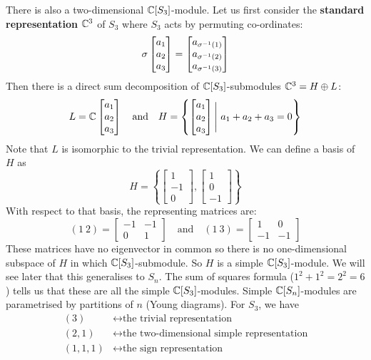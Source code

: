 \begin{exam}
\begin{enum}
		There is also a two-dimensional $\mathbb{C}[S_3]$-module.
		Let us first consider the \textbf{standard representation} $\mathbb{C}^3$ of $S_3$ where $S_3$ acts by permuting co-ordinates:
		\[\sigma
		\begin{bmatrix}
			a_1 \\ a_2 \\ a_3
		\end{bmatrix}
		=
		\begin{bmatrix}
			a_{\sigma^{-1}(1)} \\ a_{\sigma^{-1}(2)} \\ a_{\sigma^{-1}(3)}
		\end{bmatrix}\]
		Then there is a direct sum decomposition of $\mathbb{C}[S_3]$-submodules $\mathbb{C}^3=H\oplus L$:
		\[L=\mathbb{C}
		\begin{bmatrix}
			a_1 \\ a_2 \\ a_3
		\end{bmatrix}
		\quad\text{and}\quad
		H=\left\{
		\begin{bmatrix}
			a_1 \\ a_2 \\ a_3
		\end{bmatrix}
		\Bigg \vert \
		a_1+a_2+a_3=0
		\right\}\]
		Note that $L$ is isomorphic to the trivial representation.
		We can define a basis of $H$ as
		\[H=\left\{
		\begin{bmatrix}
			1 \\ -1 \\ 0
		\end{bmatrix},
		\begin{bmatrix}
			1 \\ 0 \\ -1
		\end{bmatrix}
		\right\}\]
		With respect to that basis, the representing matrices are:
		\[(1\ 2)=
		\begin{bmatrix}
			-1 & -1 \\
			0 & 1
		\end{bmatrix}
		\quad\text{and}\quad
		(1\ 3)=
		\begin{bmatrix}
			1 & 0 \\
			-1 & -1
		\end{bmatrix}
		\]
		These matrices have no eigenvector in common so there is no one-dimensional subspace of $H$ in which $\mathbb{C}[S_3]$-submodule.
		So $H$ is a simple $\mathbb{C}[S_3]$-module.
		We will see later that this generalises to $S_n$.
		The sum of squares formula ($1^2+1^2=2^2=6$) tells us that these are all the simple $\mathbb{C}[S_3]$-modules.
		Simple $\mathbb{C}[S_n]$-modules are parametrised by partitions of $n$ (Young diagrams).
		For $S_3$, we have
		\begin{align*}
			(3) &\longleftrightarrow \text{the trivial representation} \\
			(2,1) &\longleftrightarrow \text{the two-dimensional simple representation} \\
			(1,1,1) &\longleftrightarrow \text{the sign representation}
		\end{align*}
	\end{enum}
\end{exam}

